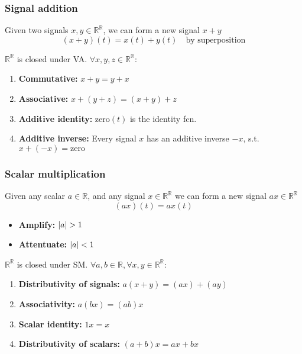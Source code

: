     \subsubsection{Signal addition}
    \begin{definition}
        Given two signals $x,y\in \mathbb{R}^\mathbb{R}$, we can form a new signal $x+y$
        \begin{equation}
            (x+y)(t) = x(t) + y(t) \quad \text{by superposition}
        \end{equation}
        \vspace{1em}

        $\mathbb{R}^\mathbb{R}$ is closed under VA. $\forall x,y,z \in \mathbb{R}^{\mathbb{R}}$:
        \begin{enumerate}
            \item \textbf{Commutative:} $x+y=y+x$
            \item \textbf{Associative:} $x+(y+z) = (x+y) + z$
            \item \textbf{Additive identity:} $\text{zero}(t)$ is the identity fcn.
            \item \textbf{Additive inverse:} Every signal $x$ has an additive inverse $-x$, s.t. $x+(-x)=\text{zero}$
        \end{enumerate}
    \end{definition}

    \subsubsection{Scalar multiplication}
    \begin{definition}
        Given any scalar $a \in \mathbb{R}$, and any signal $x \in \mathbb{R}^{\mathbb{R}}$ we can form a new signal $ax \in \mathbb{R}^{\mathbb{R}}$
        \begin{equation}
            (ax)(t) = ax(t)
        \end{equation}
        \begin{itemize}
            \item \textbf{Amplify:} $\abs{a}>1$
            \item \textbf{Attentuate:} $\abs{a}<1$
        \end{itemize}
        \vspace{1em}

        $\mathbb{R}^\mathbb{R}$ is closed under SM. $\forall a,b \in \mathbb{R}, \forall x,y \in \mathbb{R}^{\mathbb{R}}$:
        \begin{enumerate}
            \item \textbf{Distributivity of signals:} $a(x+y) = (ax) + (ay)$
            \item \textbf{Associativity:} $a(bx) = (ab)x$
            \item \textbf{Scalar identity:} $1x=x$
            \item \textbf{Distributivity of scalars:} $(a+b)x = ax + bx$
        \end{enumerate}
    \end{definition}